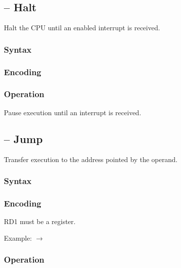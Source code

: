 \documentclass[a4paper,12pt,twoside,extrafontsizes]{memoir}
\begin{document}
{\subsection{ -- Halt}
\label{subsec:instr:hlt}

Halt the CPU until an enabled interrupt is received.

\subsubsection{Syntax}


\subsubsection{Encoding}


\subsubsection{Operation}

Pause execution until an interrupt is received.

\subsection{ -- Jump}
\label{subsec:instr:jmp}

Transfer execution to the address pointed by the operand.

\subsubsection{Syntax}


\subsubsection{Encoding}


RD1 must be a register.

Example:  $\rightarrow$ 

\subsubsection{Operation}

}
\end{document}
